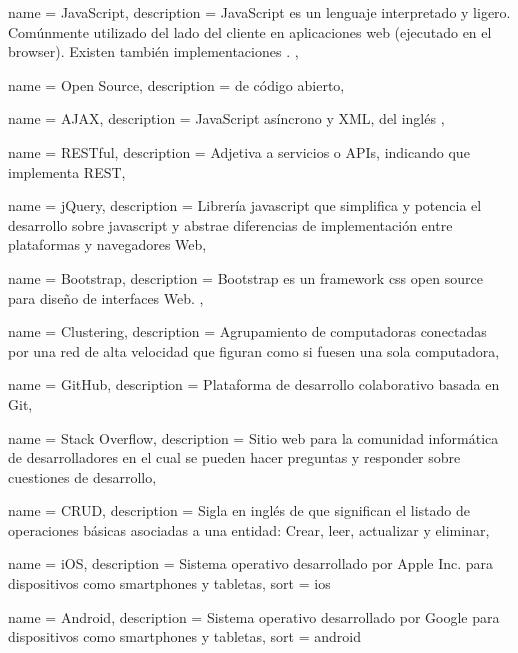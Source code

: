 \newpage

 {
  name = {JavaScript},
  description = {JavaScript es un lenguaje interpretado y ligero. Comúnmente utilizado del lado del cliente en aplicaciones web (ejecutado en el browser). Existen también implementaciones . },
}


 {
  name = {Open Source},
  description = { de código abierto},
}

 {
  name = {AJAX},
  description = {JavaScript asíncrono y XML, del inglés  },
}

 {
  name = {RESTful},
  description = {Adjetiva a servicios o APIs, indicando que implementa REST},
}

 {
  name = {jQuery},
  description = {Librería \gls{javascript} que simplifica y potencia el desarrollo sobre \gls{javascript} y abstrae diferencias de implementación entre plataformas y navegadores Web},
}

 {
  name = {Bootstrap},
  description = {Bootstrap es un \gls{framework} \gls{css} \gls{open source} para diseño de interfaces Web. },
}

 {
  name = {Clustering},
  description = {Agrupamiento de computadoras conectadas por una red de alta velocidad que figuran como si fuesen una sola computadora},
}

 {
  name = {GitHub},
  description = {Plataforma de desarrollo colaborativo basada en Git},
}

 {
  name = {Stack Overflow},
  description = {Sitio web para la comunidad informática de desarrolladores en el cual se pueden hacer preguntas y responder sobre cuestiones de desarrollo},
}

 {
  name = {CRUD},
  description = {Sigla en inglés de  que significan el listado de operaciones básicas asociadas a una entidad: Crear, leer, actualizar y eliminar},
}

 {
  name = {iOS},
  description = {Sistema operativo desarrollado por Apple Inc. para dispositivos
  como smartphones y tabletas}, sort = {ios}
}

 {
  name = {Android},
  description = {Sistema operativo desarrollado por Google para dispositivos
  como smartphones y tabletas},
  sort = {android}
}

